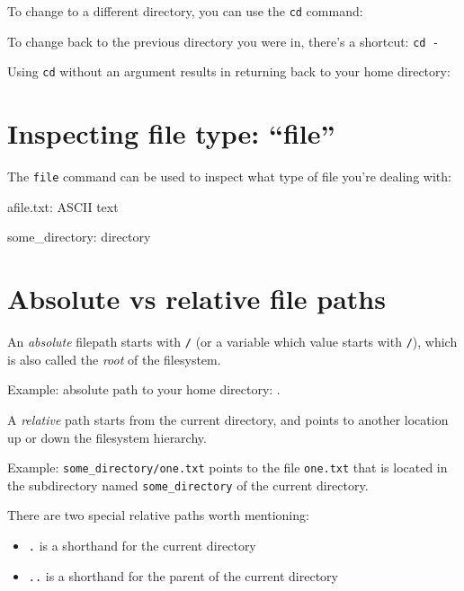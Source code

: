 To change to a different directory, you can use the \verb|cd| command:

\begin{prompt}
\end{prompt}

To change back to the previous directory you were in, there's a shortcut: \verb|cd -|

Using \verb|cd| without an argument results in returning back to your home directory:

\begin{prompt}
\end{prompt}

\section{Inspecting file type: ``file''}

The \verb|file| command can be used to inspect what type of file you're dealing with:

\begin{prompt}
afile.txt: ASCII text

some_directory: directory
\end{prompt}

\section{Absolute vs relative file paths}

An \emph{absolute} filepath starts with \verb|/| (or a variable which value starts
with  \verb|/|), which is also called the \emph{root} of the filesystem.

Example: absolute path to your home directory:
\texttt{\homedir}.

A \emph{relative} path starts from the current directory, and points to another
location up or down the filesystem hierarchy.

Example: \verb|some_directory/one.txt| points to the file \verb|one.txt| that is
located in the subdirectory named \verb|some_directory| of the current directory.

There are two special relative paths worth mentioning:

\begin{itemize}
    \item \verb|.| is a shorthand for the current directory
    \item \verb|..| is a shorthand for the parent of the current directory
\end{itemize}

